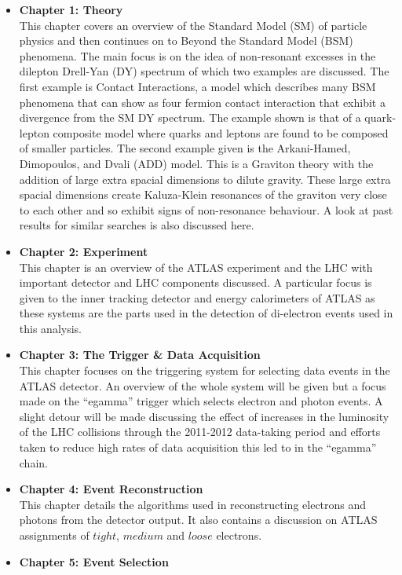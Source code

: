 \begin{itemize}
\item{ 
{\bf Chapter 1: Theory} \\
This chapter covers an overview of the Standard Model (SM) of particle physics and then continues on to Beyond the Standard Model (BSM) phenomena. The main focus is on the idea of non-resonant excesses in the dilepton Drell-Yan (DY) spectrum of which two examples are discussed. The first example is Contact Interactions, a model which describes many BSM phenomena that can show as four fermion contact interaction that exhibit a divergence from the SM DY spectrum. The example shown is that of a quark-lepton composite model where quarks and leptons are found to be composed of smaller particles. The second example given is the Arkani-Hamed, Dimopoulos, and Dvali (ADD) model. This is a Graviton theory with the addition of large extra spacial dimensions to dilute gravity. These large extra spacial dimensions create Kaluza-Klein resonances of the graviton very close to each other and so exhibit signs of non-resonance behaviour. A look at past results for similar searches is also discussed here.
}
\item{ 
{\bf Chapter 2: Experiment} \\
This chapter is an overview of the ATLAS experiment and the LHC with important detector and LHC components discussed. A particular focus is given to the inner tracking detector and energy calorimeters of ATLAS as these systems are the parts used in the detection of di-electron events used in this analysis.
}
\item{ 
{\bf Chapter 3: The Trigger \& Data Acquisition} \\
This chapter focuses on the triggering system for selecting data events in the ATLAS detector. An overview of the whole system will be given but a focus made on the ``egamma'' trigger which selects electron and photon events. A slight detour will be made discussing the effect of increases in the luminosity of the LHC collisions through the 2011-2012 data-taking period and efforts taken to reduce high rates of data acquisition this led to in the ``egamma'' chain.
}
\item{ 
{\bf Chapter 4: Event Reconstruction} \\
This chapter details the algorithms used in reconstructing electrons and photons from the detector output. It also contains a discussion on ATLAS assignments of $tight$, $medium$ and $loose$ electrons.
}
\item{ 
{\bf Chapter 5: Event Selection} \\
}
\end{itemize}
